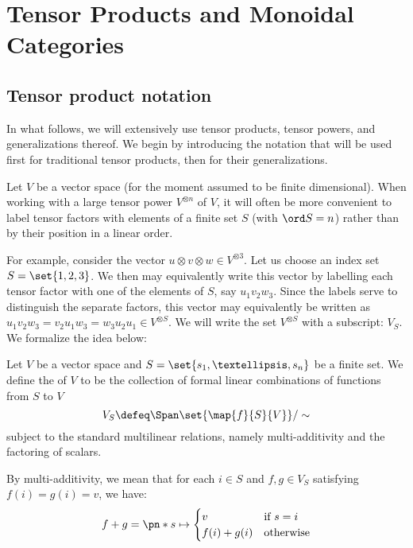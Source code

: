 \chapter{Tensor Products and Monoidal Categories}
\label{ch:intro}

\section{Tensor product notation}
In what follows, we will extensively use tensor products, tensor powers, and
generalizations thereof. We begin by introducing the notation that will be used
first for traditional tensor products, then for their generalizations.

Let $V$ be a vector space (for the moment assumed to be finite dimensional).
When working with a large tensor power $V^{\otimes n}$ of $V$, it will often be
more convenient to label tensor factors with elements of a finite set $S$ (with
$\ord S = n$) rather than by their position in a linear order.

For example, consider the vector $u \otimes v \otimes w \in V^{\otimes 3}$. Let
us choose an index set $S = \set{1,2,3}$. We then may equivalently write this
vector by labelling each tensor factor with one of the elements of $S$, say
$u_1v_2w_3$. Since the labels serve to distinguish the separate factors, this
vector may equivalently be written as $u_1v_2w_3 = v_2u_1w_3 = w_3u_2u_1 \in
V^{\otimes S}$. We will write the set $V^{\otimes S}$ with a subscript: $V_S$.
We formalize the idea below:

\begin{definition}
        Let $V$ be a vector space and $S = \set{s_1,…, s_n}$ be a finite
        set. We define the  of $V$ to be the
        collection of formal linear combinations of functions from $S$ to $V$
        \begin{equation}
                V_S \defeq \Span\set{\map {f} {S} {V}}/\sim
        \end{equation}
        subject to the standard multilinear relations, namely multi-additivity
        and the factoring of scalars.

        By multi-additivity, we mean that for each $i\in S$ and $f, g \in V_S$ satisfying
        $f(i) = g(i) = v$, we have:
        \begin{equation}
                \label{eq:tensor_additive}
                f + g = \pn*{
                        s \mapsto \begin{cases}
                                v & \text{if $s = i$}\\
                                f(i) + g(i) & \text{otherwise}
                        \end{cases}
                }
        \end{equation}
\end{definition}

